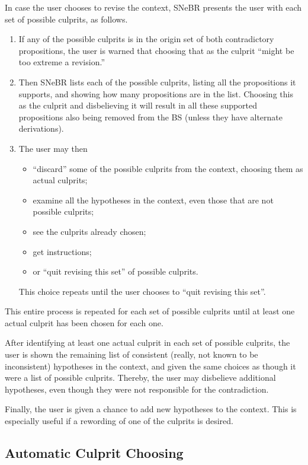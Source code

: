 \documentclass{book}
\begin{document}
In case the user chooses to revise the context, SNeBR presents
the user with each set of possible culprits, as follows.
\begin{enumerate}
\item If any of the possible culprits is in the origin set of both
  contradictory propositions, the user is warned that choosing that as
  the culprit ``might be too extreme a revision.''
\item Then SNeBR lists each of the possible culprits, listing all the
  propositions it supports, and showing how many propositions are in
  the list.  Choosing this as the culprit and disbelieving it will
  result in all these supported propositions also being removed from
  the BS (unless they have alternate derivations).
\item The user may then
  \begin{itemize}
  \item ``discard'' some of the possible culprits from the context,
    choosing them as actual culprits;
  \item examine all the hypotheses in the context, even those that are
    not possible culprits;
  \item see the culprits already chosen;
  \item get instructions;
  \item or ``quit revising this set'' of possible culprits.
  \end{itemize}
This choice repeats until the user chooses to ``quit revising this set''.
\end{enumerate}
This entire process is repeated for each set of possible culprits
until at least one actual culprit has been chosen for each one.

After identifying at least one actual culprit in each set of possible
culprits, the user is shown the remaining list of consistent (really,
not known to be inconsistent) hypotheses in the context, and given the
same choices as though it were a list of possible culprits.  Thereby,
the user may disbelieve additional hypotheses, even though they were
not responsible for the contradiction.

Finally, the user is given a chance to add new hypotheses to the context.
This is especially useful if a rewording of one of the culprits is
desired.

\subsection{Automatic Culprit Choosing}\label{sec:autoCulpritChoosing}
\end{document}
